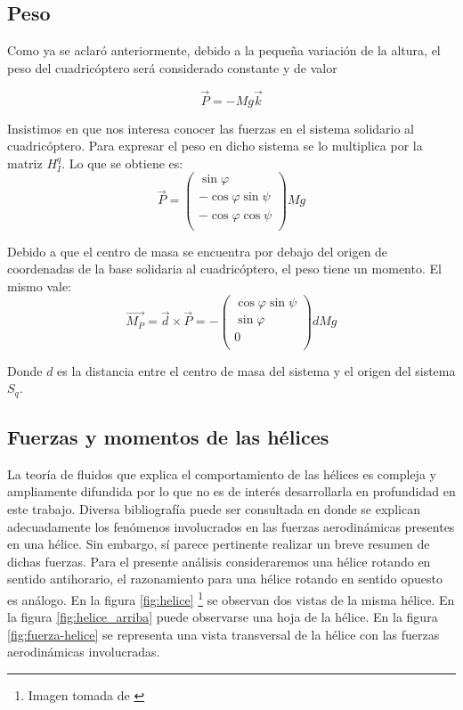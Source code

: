 \documentclass[main]{subfiles}
\begin{document}
\subsection{Peso}
Como ya se aclar\'o anteriormente, debido a la peque\~na variaci\'on de la altura, el peso del cuadric\'optero ser\'a considerado constante y de valor

\begin{equation}
\vec{P}=-Mg\vec{k}
\end{equation}

Insistimos en que nos interesa conocer las fuerzas en el sistema solidario al cuadric\'optero. Para expresar el peso en dicho sistema se lo multiplica por la matriz $H_I^q$. Lo que se obtiene es:
\begin{equation}
\vec{P}=\left(\begin{array}{c}
\sin\varphi\\
-\cos\varphi\sin\psi\\
-\cos\varphi\cos\psi\\
\end{array}\right)Mg
\end{equation}

Debido a que el centro de masa se encuentra por debajo del origen de coordenadas de la base solidaria al cuadric\'optero, el peso tiene un momento. El mismo vale:
\begin{equation}
\vec{M_P}=\vec{d}\times\vec{P} =-\left(\begin{array}{c}
\cos\varphi\sin\psi\\
\sin\varphi   \\
0\\
\end{array}\right)dMg
\end{equation}

Donde $d$ es la distancia entre el centro de masa del sistema y el origen del sistema $S_q$.
\subsection{Fuerzas y momentos de las h\'elices}

La teor\'ia de fluidos que explica el comportamiento de las h\'elices es compleja y ampliamente difundida por lo que no es de inter\'es desarrollarla en profundidad en este trabajo. Diversa bibliograf\'ia puede ser consultada en donde se explican adecuadamente los fen\'omenos involucrados en las fuerzas aerodin\'amicas presentes en una h\'elice. Sin embargo, s\'i parece pertinente realizar un breve resumen de dichas fuerzas. Para el presente an\'alisis consideraremos una h\'elice rotando en sentido antihorario, el razonamiento para una h\'elice rotando en sentido opuesto es an\'alogo. En la figura \ref{fig:helice} \footnote{Imagen tomada de \cite{bib:fuerzas-helices}} se observan dos vistas de la misma h\'elice. En la figura \ref{fig:helice_arriba} puede observarse una hoja de la h\'elice. En la figura \ref{fig:fuerza-helice} se representa una vista transversal de la h\'elice con las fuerzas aerodin\'amicas involucradas.\\ 
\end{document}
